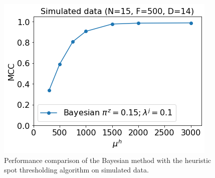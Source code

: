 \begin{figure}
\includegraphics[width=\linewidth]{figures/figure5.png}
\caption{Performance comparison of the Bayesian method with the heuristic spot thresholding algorithm on simulated data.}
\label{fig:simulated_data}
\end{figure}